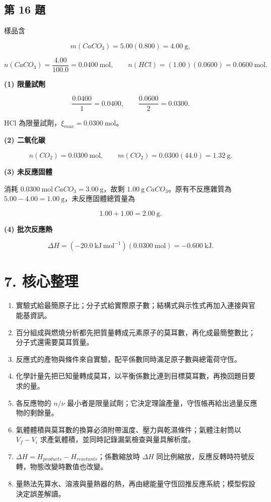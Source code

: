 \documentclass[11pt,a4paper]{article}
\providecommand{\tightlist}{%
  \setlength{\itemsep}{0pt}\setlength{\parskip}{0pt}}
\begin{document}
\subsection{第 16 題}\label{ux7b2c-16-ux984c}

樣品含

\[
m(CaCO_3)=5.00(0.800)=4.00\ \mathrm g,
\]

\[
n(CaCO_3)=\frac{4.00}{100.0}=0.0400\ \mathrm{mol},
\qquad
n(HCl)=(1.00)(0.0600)=0.0600\ \mathrm{mol}.
\]

\textbf{(1) 限量試劑}

\[
\frac{0.0400}{1}=0.0400,
\qquad
\frac{0.0600}{2}=0.0300.
\]

HCl 為限量試劑，\(\xi_{max}=0.0300\ \mathrm{mol}\)。

\textbf{(2) 二氧化碳}

\[
n(CO_2)=0.0300\ \mathrm{mol},
\qquad
m(CO_2)=0.0300(44.0)=1.32\ \mathrm g.
\]

\textbf{(3) 未反應固體}

消耗 \(0.0300\ \mathrm{mol}\ CaCO_3=3.00\ \mathrm g\)，故剩 \(1.00\ \mathrm g\ CaCO_3\)。原有不反應雜質為 \(5.00-4.00=1.00\ \mathrm g\)，未反應固體總質量為

\[
1.00+1.00=2.00\ \mathrm g.
\]

\textbf{(4) 批次反應熱}

\[
\Delta H=(-20.0\ \mathrm{kJ\,mol^{-1}})(0.0300\ \mathrm{mol})
=-0.600\ \mathrm{kJ}.
\]

\section{7. 核心整理}\label{ux6838ux5fc3ux6574ux7406}

\begin{enumerate}
\def\labelenumi{\arabic{enumi}.}
\tightlist
\item
  實驗式給最簡原子比；分子式給實際原子數；結構式與示性式再加入連接與官能基資訊。
\item
  百分組成與燃燒分析都先把質量轉成元素原子的莫耳數，再化成最簡整數比；分子式還需要莫耳質量。
\item
  反應式的產物與條件來自實驗，配平係數同時滿足原子數與總電荷守恆。
\item
  化學計量先把已知量轉成莫耳，以平衡係數比連到目標莫耳數，再換回題目要求的量。
\item
  各反應物的 \(n/\nu\) 最小者是限量試劑；它決定理論產量，守恆帳再給出過量反應物的剩餘量。
\item
  氣體體積與莫耳數的換算必須附帶溫度、壓力與乾濕條件；氣體注射筒以 \(V_f-V_i\) 求產氣體積，並同時記錄漏氣檢查與量具解析度。
\item
  \(\Delta H=H_{products}-H_{reactants}\)；係數縮放時 \(\Delta H\) 同比例縮放，反應反轉時符號反轉，物態改變時數值也改變。
\item
  量熱法先算水、溶液與量熱器的熱，再由總能量守恆回推反應系統；模型假設決定誤差解讀。
\end{enumerate}
\end{document}
